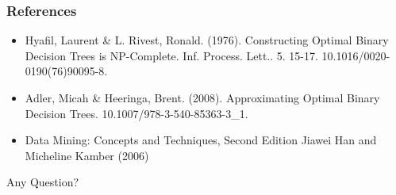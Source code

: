 \documentclass{beamer}
\begin{document}
\begin{frame}
	\frametitle{References}
	\begin{itemize}
		\item
		Hyafil, Laurent \& L. Rivest, Ronald. (1976). Constructing Optimal Binary Decision Trees is NP-Complete. Inf. Process. Lett.. 5. 15-17. 10.1016/0020-0190(76)90095-8. 
		\item
		Adler, Micah \& Heeringa, Brent. (2008). Approximating Optimal Binary Decision Trees. 10.1007/978-3-540-85363-3\_1. 
		\item
		Data Mining: Concepts and Techniques, Second Edition
		Jiawei Han and Micheline Kamber (2006)
	\end{itemize}
\end{frame}

\begin{frame}
	\Huge
	\centering
	Any Question?
\end{frame}
\end{document}
